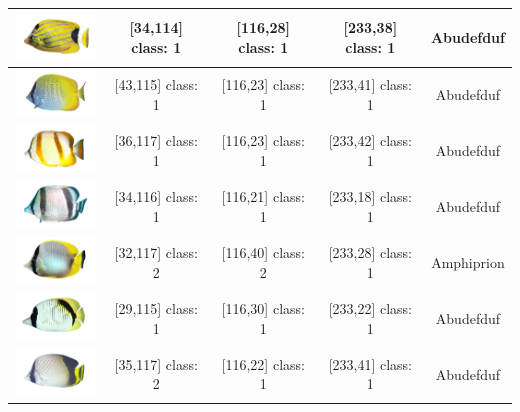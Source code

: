 \begin{longtable}{|c|c|c|c|c|}
	\includegraphics[width=3cm]{gambar/dataset_validasi/Chaetodon16} & [34,114] class: 1 & [116,28] class: 1 & [233,38] class: 1 & Abudefduf \\ \hline
	\includegraphics[width=3cm]{gambar/dataset_validasi/Chaetodon17} & [43,115] class: 1 & [116,23] class: 1 & [233,41] class: 1 & Abudefduf \\ \hline
	\includegraphics[width=3cm]{gambar/dataset_validasi/Chaetodon18} & [36,117] class: 1 & [116,23] class: 1 & [233,42] class: 1 & Abudefduf \\ \hline
	\includegraphics[width=3cm]{gambar/dataset_validasi/Chaetodon19} & [34,116] class: 1 & [116,21] class: 1 & [233,18] class: 1 & Abudefduf \\ \hline
	\includegraphics[width=3cm]{gambar/dataset_validasi/Chaetodon20} & [32,117] class: 2 & [116,40] class: 2 & [233,28] class: 1 & Amphiprion \\ \hline
	\includegraphics[width=3cm]{gambar/dataset_validasi/Chaetodon21} & [29,115] class: 1 & [116,30] class: 1 & [233,22] class: 1 & Abudefduf \\ \hline
	\includegraphics[width=3cm]{gambar/dataset_validasi/Chaetodon22} & [35,117] class: 2 & [116,22] class: 1 & [233,41] class: 1 & Abudefduf \\ \hline

\end{longtable}
